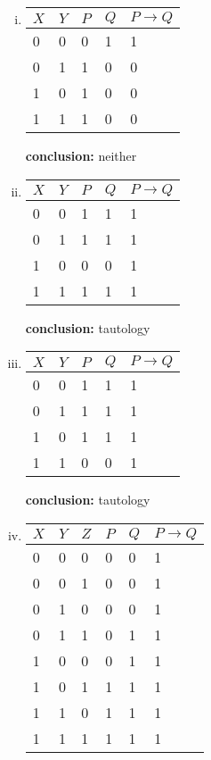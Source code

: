 \documentclass{article}
\begin{document}
\begin{enumerate}
\begin{enumerate}[(i)]
    \item %
          \begin{tabular}{|l|l|l|l|l|}
            \hline
            $X$ & $Y$ & $P$ & $Q$ & $P\to Q$\\ \hline
            0&0&0&1&1\\
            0&1&1&0&0\\
            1&0&1&0&0\\
            1&1&1&0&0\\ \hline
          \end{tabular}
          \textbf{conclusion:} neither
    \item %
          \begin{tabular}{|l|l|l|l|l|}
            \hline
            $X$ & $Y$ & $P$ & $Q$ & $P\to Q$\\ \hline
            0&0&1&1&1\\
            0&1&1&1&1\\
            1&0&0&0&1\\
            1&1&1&1&1\\\hline
          \end{tabular}
          \textbf{conclusion:} tautology
    \item %
          \begin{tabular}{|l|l|l|l|l|}
            \hline
            $X$ & $Y$ & $P$ & $Q$ & $P\to Q$\\ \hline
            0&0&1&1&1\\
            0&1&1&1&1\\
            1&0&1&1&1\\
            1&1&0&0&1\\\hline
          \end{tabular}
          \textbf{conclusion:} tautology
    \item %
          \begin{tabular}{|l|l|l|l|l|l|}
            \hline
            $X$ & $Y$ & $Z$ & $P$ & $Q$ & $P\to Q$\\ \hline
            0&0&0&0&0&1\\
            0&0&1&0&0&1\\
            0&1&0&0&0&1\\
            0&1&1&0&1&1\\
            1&0&0&0&1&1\\
            1&0&1&1&1&1\\
            1&1&0&1&1&1\\
            1&1&1&1&1&1\\\hline

\end{tabular}
\end{enumerate}
\end{enumerate}
\end{document}
